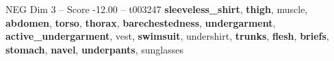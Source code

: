 \begin{textsample}{NEG Dim 3 – Score -12.00 – t003247}  \label{ex:f3_neg_032}
\textbf{sleeveless\_shirt}, \textbf{thigh}, muscle, \textbf{abdomen}, \textbf{torso}, \textbf{thorax}, \textbf{barechestedness}, \textbf{undergarment}, \textbf{active\_undergarment}, vest, \textbf{swimsuit}, undershirt, \textbf{trunks}, \textbf{flesh}, \textbf{briefs}, \textbf{stomach}, \textbf{navel}, \textbf{underpants}, sunglasses

\end{textsample}
